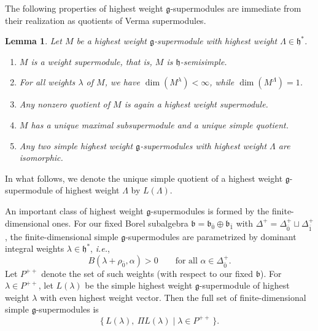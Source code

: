 \documentclass[11pt]{amsart}
\def\hh{{\mathfrak h}}
\def\bb{{\mathfrak b}}
\def\gg{{\mathfrak{g}}}
\theoremstyle{plain}
\newtheorem{lemma}[theorem]{Lemma}
\theoremstyle{remark}
\theoremstyle{definition}
\numberwithin{equation}{section}
\theoremstyle{remark}
\begin{document}
The following properties of highest weight $\gg$-supermodules are immediate from their realization as quotients of Verma supermodules.

\begin{lemma}
 Let $M$ be a highest weight $\gg$-supermodule with highest weight $\Lambda \in \hh^{\ast}$.
 \begin{enumerate}
 \item[a)] $M$ is a \emph{weight supermodule}, that is, $M$ is $\hh$-semisimple.
\item[b)] For all weights $\lambda$ of $M$, we have $\dim(M^{\lambda}) < \infty$, while $\dim(M^{\Lambda})=1$.
\item[c)] Any nonzero quotient of $M$ is again a highest weight supermodule.
\item[d)] $M$ has a unique maximal subsupermodule and a unique simple quotient. 
\item[e)] Any two simple highest weight $\gg$-supermodules with highest weight $\Lambda$ are isomorphic.
 \end{enumerate}
\end{lemma}

In what follows, we denote the unique simple quotient of a highest weight $\gg$-supermodule of highest weight $\Lambda$ by $L(\Lambda)$.

An important class of highest weight $\gg$-supermodules is formed by the finite-dimensional ones. For our fixed Borel subalgebra
$\bb=\bb_{\bar 0}\oplus\bb_{\bar 1}$ with $\Delta^{+}=\Delta_{\bar 0}^{+}\sqcup\Delta_{\bar 1}^{+}$, the finite-dimensional simple $\gg$-supermodules are parametrized by dominant integral weights $\lambda\in\hh^{\ast}$, \emph{i.e.},
\begin{equation}
 B(\lambda+\rho_{\bar 0},\alpha)>0\qquad\text{for all }\alpha\in\Delta_{\bar 0}^{+}.
\end{equation}
Let $P^{++}$ denote the set of such weights (with respect to our fixed $\bb$). For $\lambda\in P^{++}$, let $L(\lambda)$ be the
simple highest weight $\gg$-supermodule of highest weight $\lambda$ with even highest weight vector. Then the full set of finite-dimensional
simple $\gg$-supermodules is
\begin{equation}
 \{\,L(\lambda),\ \Pi L(\lambda)\mid \lambda\in P^{++}\,\}.
\end{equation}
\end{document}
